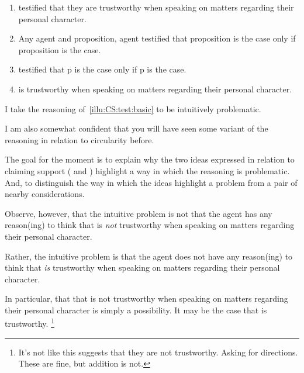 \begin{note}[Testimony 1]
  \begin{illustration}[Testimony 1]
    \label{illu:CS:test:basic}
    \mbox{}
    \begin{enumerate}[label=\arabic*., ref=(\arabic*)]
    \item\label{ex:eiS:t:basic:test}  testified that they are trustworthy when speaking on matters regarding their personal character.
    \item Any agent and proposition, agent testified that proposition is the case only if proposition is the case.
    \item {} testified that p is the case only if p is the case.
    \item\label{ex:eiS:t:basic:ok}  is trustworthy when speaking on matters regarding their personal character.
    \end{enumerate}
  \end{illustration}

  I take the reasoning of~\autoref{illu:CS:test:basic} to be intuitively problematic.

  I am also somewhat confident that you will have seen some variant of the reasoning in relation to circularity before.

  The goal for the moment is to explain why the two ideas expressed in relation to claiming support (\nfcs{} and \eiS{}) highlight a way in which the reasoning is problematic.
  And, to distinguish the way in which the ideas highlight a problem from a pair of nearby considerations.
\end{note}

\begin{note}
  Observe, however, that the intuitive problem is not that the agent has any reason(ing) to think that  is \emph{not} trustworthy when speaking on matters regarding their personal character.

  Rather, the intuitive problem is that the agent does not have any reason(ing) to think that  \emph{is} trustworthy when speaking on matters regarding their personal character.

  In particular, that that  is not trustworthy when speaking on matters regarding their personal character is simply a possibility.
  It may be the case that  is trustworthy.\nolinebreak
  \footnote{
    \color{red}
    It's not like this suggests that they are not trustworthy.
    Asking for directions.
    These are fine, but addition is not.
  }
\end{note}

